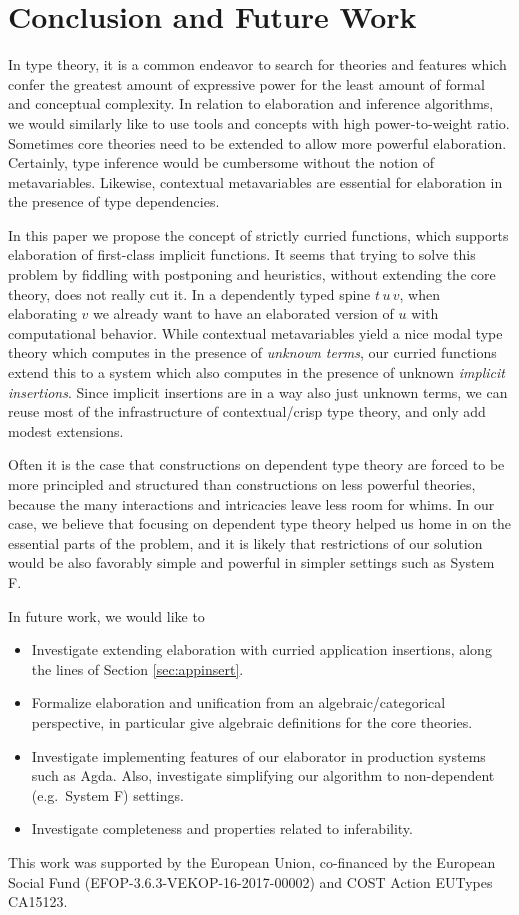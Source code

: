 \documentclass[acmsmall,review,anonymous,prologue,dvipsnames]{acmart}\settopmatter{printfolios=true,printccs=false,printacmref=false}
\theoremstyle{remark}
\begin{document}
\section{Conclusion and Future Work}

In type theory, it is a common endeavor to search for theories and features
which confer the greatest amount of expressive power for the least amount of
formal and conceptual complexity. In relation to elaboration and inference
algorithms, we would similarly like to use tools and concepts with high
power-to-weight ratio. Sometimes core theories need to be extended to allow more
powerful elaboration. Certainly, type inference would be cumbersome without the
notion of metavariables. Likewise, contextual metavariables are essential
for elaboration in the presence of type dependencies.

In this paper we propose the concept of strictly curried functions, which
supports elaboration of first-class implicit functions. It seems that trying to
solve this problem by fiddling with postponing and heuristics, without extending
the core theory, does not really cut it. In a dependently typed spine $t\,u\,v$, when
elaborating $v$ we already want to have an elaborated version of $u$ with
computational behavior. While contextual metavariables yield a nice modal type
theory which computes in the presence of \emph{unknown terms}, our curried
functions extend this to a system which also computes in the presence of
unknown \emph{implicit insertions}. Since implicit insertions are in a way also
just unknown terms, we can reuse most of the infrastructure of contextual/crisp
type theory, and only add modest extensions.

Often it is the case that constructions on dependent type theory are forced to
be more principled and structured than constructions on less powerful theories,
because the many interactions and intricacies leave less room for whims. In our
case, we believe that focusing on dependent type theory helped us home in on the
essential parts of the problem, and it is likely that restrictions of our
solution would be also favorably simple and powerful in simpler settings such as
System F.

In future work, we would like to
\begin{itemize}
\item Investigate extending elaboration with curried application insertions, along the lines
      of Section \ref{sec:appinsert}.
\item Formalize elaboration and unification from an algebraic/categorical perspective, in particular
      give algebraic definitions for the core theories.
\item Investigate implementing features of our elaborator in production systems
      such as Agda. Also, investigate simplifying our algorithm to non-dependent
      (e.g.\ System F) settings.
\item Investigate completeness and properties related to inferability.
\end{itemize}


\begin{acks}
  This work was supported by the European Union, co-financed by the
  European Social Fund (EFOP-3.6.3-VEKOP-16-2017-00002) and COST Action
  EUTypes CA15123.
\end{acks}


\end{document}
